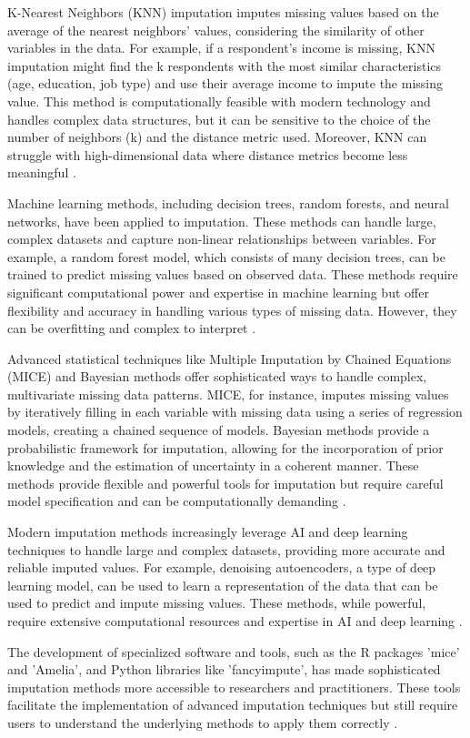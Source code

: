 K-Nearest Neighbors (KNN) imputation imputes missing values based on the average of the nearest neighbors' values, considering the similarity of other variables in the data. For example, if a respondent's income is missing, KNN imputation might find the k respondents with the most similar characteristics (age, education, job type) and use their average income to impute the missing value. This method is computationally feasible with modern technology and handles complex data structures, but it can be sensitive to the choice of the number of neighbors (k) and the distance metric used. Moreover, KNN can struggle with high-dimensional data where distance metrics become less meaningful \cite{pujianto2019k}.

Machine learning methods, including decision trees, random forests, and neural networks, have been applied to imputation. These methods can handle large, complex datasets and capture non-linear relationships between variables. For example, a random forest model, which consists of many decision trees, can be trained to predict missing values based on observed data. These methods require significant computational power and expertise in machine learning but offer flexibility and accuracy in handling various types of missing data. However, they can be overfitting and complex to interpret \cite{stekhoven2012missforest}.

Advanced statistical techniques like Multiple Imputation by Chained Equations (MICE) and Bayesian methods offer sophisticated ways to handle complex, multivariate missing data patterns. MICE, for instance, imputes missing values by iteratively filling in each variable with missing data using a series of regression models, creating a chained sequence of models. Bayesian methods provide a probabilistic framework for imputation, allowing for the incorporation of prior knowledge and the estimation of uncertainty in a coherent manner. These methods provide flexible and powerful tools for imputation but require careful model specification and can be computationally demanding \cite{Buuren2011MICEMI}.

Modern imputation methods increasingly leverage AI and deep learning techniques to handle large and complex datasets, providing more accurate and reliable imputed values. For example, denoising autoencoders, a type of deep learning model, can be used to learn a representation of the data that can be used to predict and impute missing values. These methods, while powerful, require extensive computational resources and expertise in AI and deep learning \cite{gondara2018mida}.

The development of specialized software and tools, such as the R packages 'mice' and 'Amelia', and Python libraries like 'fancyimpute', has made sophisticated imputation methods more accessible to researchers and practitioners. These tools facilitate the implementation of advanced imputation techniques but still require users to understand the underlying methods to apply them correctly \cite{Buuren2011MICEMI, Honaker2011AmeliaIA}.
